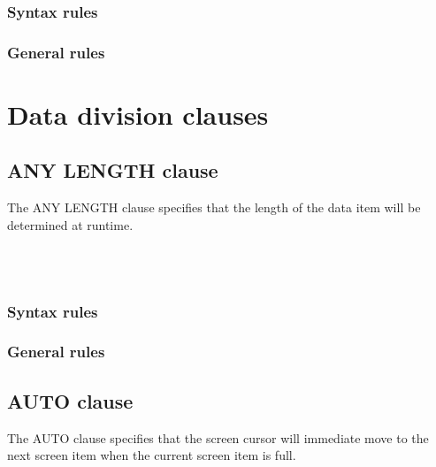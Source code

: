 \subsubsection{Syntax rules}

\subsubsection{General rules}

\section{Data division clauses}

\subsection{ANY LENGTH clause}

The ANY LENGTH clause specifies that the length of the data item will be determined at runtime.

\begin{syntax}
  \begin{1=}
     \\
     \\
  \end{1=}
\end{syntax}

\subsubsection{Syntax rules}

\subsubsection{General rules}

\subsection{AUTO clause}

The AUTO clause specifies that the screen cursor will immediate move to the next screen item when the current screen item is full.

\begin{syntax}
  \begin{1=}
     \\
     \\
     \\
  \end{1=}
\end{syntax}

